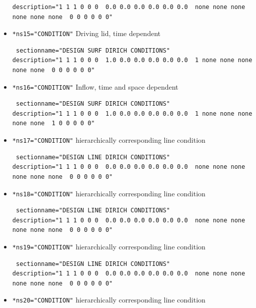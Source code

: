 \begin{itemize}
\begin{small}
\begin{verbatim}
description="1 1 1 0 0 0  0.0 0.0 0.0 0.0 0.0 0.0  none none none none none none  0 0 0 0 0 0"
\end{verbatim} \end{small} \item \verb|*ns15="CONDITION"| \qquad Driving lid, time dependent
\begin{small} \begin{verbatim} sectionname="DESIGN SURF DIRICH CONDITIONS"
description="1 1 1 0 0 0  1.0 0.0 0.0 0.0 0.0 0.0  1 none none none none none  0 0 0 0 0 0"
\end{verbatim} \end{small} \item \verb|*ns16="CONDITION"| \qquad Inflow, time and space dependent
\begin{small} \begin{verbatim} sectionname="DESIGN SURF DIRICH CONDITIONS"
description="1 1 1 0 0 0  1.0 0.0 0.0 0.0 0.0 0.0  1 none none none none none  1 0 0 0 0 0"
\end{verbatim} \end{small} \item \verb|*ns17="CONDITION"| \qquad hierarchically corresponding line condition
\begin{small} \begin{verbatim} sectionname="DESIGN LINE DIRICH CONDITIONS"
description="1 1 1 0 0 0  0.0 0.0 0.0 0.0 0.0 0.0  none none none none none none  0 0 0 0 0 0"
\end{verbatim} \end{small} \item \verb|*ns18="CONDITION"| \qquad hierarchically corresponding line condition
\begin{small} \begin{verbatim} sectionname="DESIGN LINE DIRICH CONDITIONS"
description="1 1 1 0 0 0  0.0 0.0 0.0 0.0 0.0 0.0  none none none none none none  0 0 0 0 0 0"
\end{verbatim} \end{small} \item \verb|*ns19="CONDITION"| \qquad hierarchically corresponding line condition
\begin{small} \begin{verbatim} sectionname="DESIGN LINE DIRICH CONDITIONS"
description="1 1 1 0 0 0  0.0 0.0 0.0 0.0 0.0 0.0  none none none none none none  0 0 0 0 0 0"
\end{verbatim} \end{small} \item \verb|*ns20="CONDITION"| \qquad hierarchically corresponding line condition

\end{itemize}

